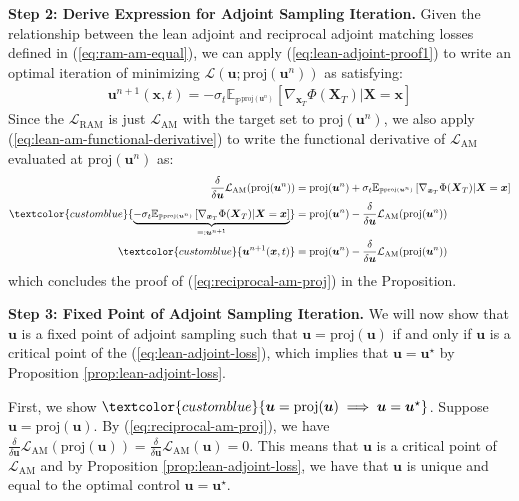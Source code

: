 \documentclass{article}
\newcommand{\bluetext}[1]{\textcolor{customblue}{#1}}
\begin{document}
\textbf{Step 2: Derive Expression for Adjoint Sampling Iteration.}
Given the relationship between the lean adjoint and reciprocal adjoint matching losses defined in (\ref{eq:ram-am-equal}), we can apply (\ref{eq:lean-adjoint-proof1}) to write an optimal iteration of minimizing $\mathcal{L}(\boldsymbol{u}; \text{proj}(\boldsymbol{u}^n))$ as satisfying:
\begin{align}
    \boldsymbol{u}^{n+1}(\boldsymbol{x},t)=-\sigma_t\mathbb{E}_{\mathbb{P}^{\text{proj}(\boldsymbol{u}^n)}}\left[\nabla_{\boldsymbol{x}_T}\Phi(\boldsymbol{X}_T)|\boldsymbol{X}=\boldsymbol{x}\right]
\end{align}
Since the $\mathcal{L}_{\text{RAM}}$ is just $\mathcal{L}_{\text{AM}}$ with the target set to $\text{proj}(\boldsymbol{u}^n)$, we also apply (\ref{eq:lean-am-functional-derivative}) to write the functional derivative of $\mathcal{L}_{\text{AM}}$ evaluated at $\text{proj}(\boldsymbol{u}^n)$ as:
\begin{align}
    \frac{\delta}{\delta\boldsymbol{u}}\mathcal{L}_{\text{AM}}(\text{proj}(\boldsymbol{u}^n))&=\text{proj}(\boldsymbol{u}^n)+\sigma_t\mathbb{E}_{\mathbb{P}^{\text{proj}(\boldsymbol{u}^n)}}\left[\nabla_{\boldsymbol{x}_T}\Phi(\boldsymbol{X}_T)|\boldsymbol{X}=\boldsymbol{x}\right]\nonumber\\
    \bluetext{\underbrace{-\sigma_t\mathbb{E}_{\mathbb{P}^{\text{proj}(\boldsymbol{u}^n)}}\left[\nabla_{\boldsymbol{x}_T}\Phi(\boldsymbol{X}_T)|\boldsymbol{X}=\boldsymbol{x}\right]}_{=:\boldsymbol{u}^{n+1}}}&=\text{proj}(\boldsymbol{u}^n)-\frac{\delta}{\delta\boldsymbol{u}}\mathcal{L}_{\text{AM}}(\text{proj}(\boldsymbol{u}^n))\nonumber\\
    \bluetext{\boldsymbol{u}^{n+1}(\boldsymbol{x},t)}&=\text{proj}(\boldsymbol{u}^n)-\frac{\delta}{\delta\boldsymbol{u}}\mathcal{L}_{\text{AM}}(\text{proj}(\boldsymbol{u}^n))
\end{align}
which concludes the proof of (\ref{eq:reciprocal-am-proj}) in the Proposition. 

\textbf{Step 3: Fixed Point of Adjoint Sampling Iteration.} 
We will now show that $\boldsymbol{u}$ is a fixed point of adjoint sampling such that $\boldsymbol{u}=\text{proj}(\boldsymbol{u})$ if and only if $\boldsymbol{u}$ is a critical point of the (\ref{eq:lean-adjoint-loss}), which implies that $\boldsymbol{u}=\boldsymbol{u}^\star$ by Proposition \ref{prop:lean-adjoint-loss}. 

First, we show $\bluetext{\boldsymbol{u}=\text{proj}(\boldsymbol{u})\implies \boldsymbol{u}=\boldsymbol{u}^\star}$. Suppose $\boldsymbol{u}=\text{proj}(\boldsymbol{u})$. By (\ref{eq:reciprocal-am-proj}), we have $\frac{\delta}{\delta \boldsymbol{u}}\mathcal{L}_{\text{AM}}(\text{proj}(\boldsymbol{u}))=\frac{\delta}{\delta \boldsymbol{u}}\mathcal{L}_{\text{AM}}(\boldsymbol{u})=0$. This means that $\boldsymbol{u}$ is a critical point of $\mathcal{L}_{\text{AM}}$ and by Proposition \ref{prop:lean-adjoint-loss}, we have that $\boldsymbol{u}$ is unique and equal to the optimal control $\boldsymbol{u}=\boldsymbol{u}^\star$.
\end{document}
